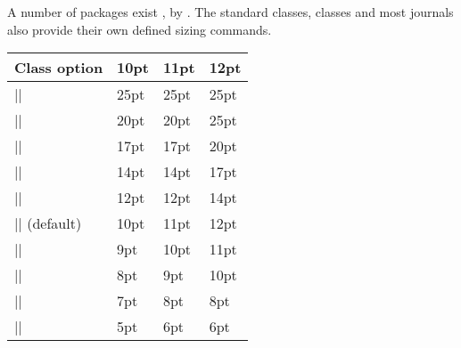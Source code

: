 A number of packages exist  \citep{moresize},
  by \citeauthor{anyfont}. The standard classes, 
  classes and most journals also provide their own
 defined sizing commands.
 

\begin{trivlist}\item[]
\begin{tabular}{llll}
\toprule
Class option &10pt &11pt &12pt\\
\midrule
|\Huge|      &25pt &25pt &25pt\\
|\huge|      &20pt &20pt &25pt\\
|\LARGE|     &17pt &17pt &20pt\\
|\Large|     &14pt &14pt &17pt\\
|\large|     &12pt &12pt &14pt\\
|\normalsize| (default) &10pt &11pt &12pt\\
|\small|     &9pt &10pt &11pt\\
|\footnotesize| &8pt &9pt &10pt\\
|\scriptsize| &7pt &8pt &8pt\\
|\tiny|       &5pt &6pt &6pt\\
\bottomrule
\end{tabular}
\end{trivlist}














